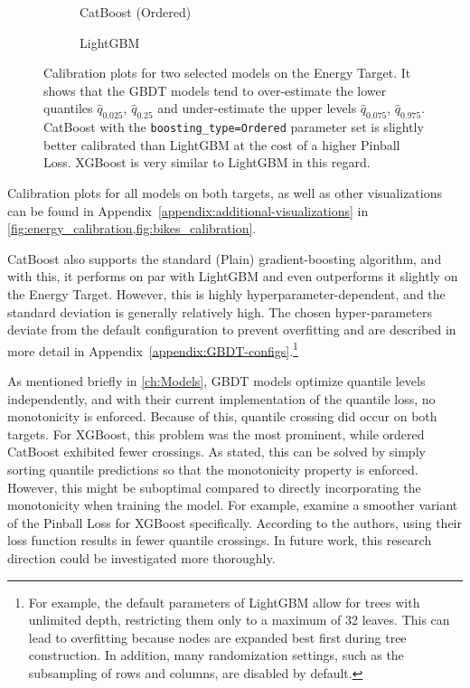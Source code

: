 \begin{figure}[htbp]
    \centering
    \begin{subfigure}[b]{0.5\textwidth}
        \centering
        
        \caption{CatBoost (Ordered)}
        \label{fig:catboost-ordered-calibration}
    \end{subfigure}%
    \begin{subfigure}[b]{0.5\textwidth}
        \centering
        
        \caption{LightGBM}
        \label{fig:lgbm-calibration}
    \end{subfigure}
    \caption{Calibration plots for two selected models on the Energy Target. It shows that the GBDT models tend to over-estimate the lower quantiles $\hat{q}_{0.025}$, $\hat{q}_{0.25}$ and under-estimate the upper levels $\hat{q}_{0.075}$, $\hat{q}_{0.975}$. CatBoost with the \texttt{boosting\_type=Ordered} parameter set is slightly better calibrated than LightGBM at the cost of a higher Pinball Loss. XGBoost is very similar to LightGBM in this regard.}
    \label{fig:calibration-comparison}
\end{figure}
Calibration plots for all models on both targets, as well as other visualizations can be found in Appendix~\ref{appendix:additional-visualizations} in \cref{fig:energy_calibration,fig:bikes_calibration}.

CatBoost also supports the standard (Plain) gradient-boosting algorithm,
and with this, it performs on par with LightGBM and even outperforms it slightly on
the Energy Target. However, this is highly hyperparameter-dependent, and the standard
deviation is generally relatively high. The chosen hyper-parameters deviate from the default 
configuration to prevent overfitting and are described in more detail in Appendix~\ref{appendix:GBDT-configs}.\footnote{For example, the default parameters of LightGBM allow for trees with unlimited depth, restricting them only to a maximum of 32 leaves. This can lead to overfitting because nodes are expanded best first during tree construction. In addition, many randomization settings, such as the subsampling of rows and columns, are disabled by default.}

As mentioned briefly in \cref{ch:Models}, GBDT models optimize quantile levels independently, and with their current implementation of the quantile loss, no monotonicity is enforced. Because of this, quantile crossing did occur on both targets. For XGBoost, this problem was the most prominent, while ordered CatBoost exhibited fewer crossings. As stated, this can be solved by simply sorting quantile predictions so that the monotonicity property is enforced. However, this might be suboptimal compared to directly incorporating the monotonicity when training the model. For example, \cite{sluijterman_composite_2024} examine a smoother variant of the Pinball Loss for XGBoost specifically. According to the authors, using their loss function results in fewer quantile crossings. In future work, this research direction could be investigated more thoroughly.

